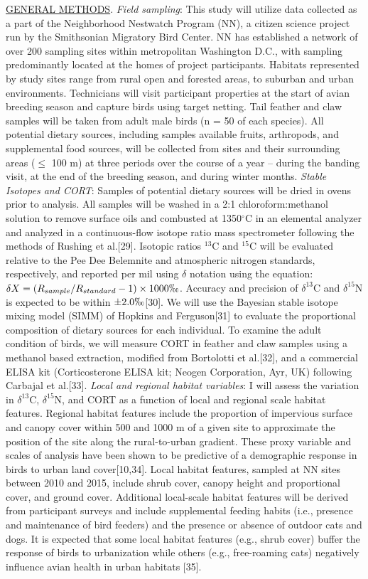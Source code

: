 \documentclass[12pt]{article}
\begin{document}
\noindent \underline{GENERAL METHODS}. \textit {Field sampling}: This study will utilize data collected as a part of the Neighborhood Nestwatch Program (NN), a citizen science project run by the Smithsonian Migratory Bird Center. NN has established a network of over 200 sampling sites within metropolitan Washington D.C., with sampling predominantly located at the homes of project participants. Habitats represented by study sites range from rural open and forested areas, to suburban and urban environments. Technicians will visit participant properties at the start of avian breeding season and capture birds using target netting. Tail feather and claw samples will be taken from adult male birds (n = 50 of each species). All potential dietary sources, including samples available fruits, arthropods, and supplemental food sources, will be collected from sites and their surrounding areas ($\leq$ 100 m) at three periods over the course of a year -- during the banding visit, at the end of the breeding season, and during winter months. \textit{Stable Isotopes and CORT}: Samples of potential dietary sources will be dried in ovens prior to analysis. All samples will be washed in a 2:1 chloroform:methanol solution to remove surface oils and combusted at 1350$^{\circ}$C in an elemental analyzer and analyzed in a continuous-flow isotope ratio mass spectrometer following the methods of Rushing et al.[29]. Isotopic ratios $^{13}$C and $^{15}$C will be evaluated relative to the Pee Dee Belemnite and atmospheric nitrogen standards, respectively, and reported per mil using $\delta$ notation using the equation: $\delta{X} = (R_{sample}/R_{standard} -1) \times 1000\permil$. Accuracy and precision of $\delta^{13}$C and $\delta^{15}$N is expected to be within $\pm 2.0 \permil$[30]. We will use the Bayesian stable isotope mixing model (SIMM) of Hopkins and Ferguson[31] to evaluate the proportional composition of dietary sources for each individual. To examine the adult condition of birds, we will measure CORT in feather and claw samples using a methanol based extraction, modified from Bortolotti et al.[32], and a commercial ELISA kit (Corticosterone ELISA kit; Neogen Corporation, Ayr, UK) following Carbajal et al.[33]. \textit{Local and regional habitat variables}: I will assess the variation in $\delta^{13}$C,  $\delta^{15}$N, and CORT as a function of local and regional scale habitat features. Regional habitat features include the proportion of impervious surface and canopy cover within 500 and 1000 m of a given site to approximate the position of the site along the rural-to-urban gradient. These proxy variable and scales of analysis have been shown to be predictive of a demographic response in birds to urban land cover[10,34]. Local habitat features, sampled at NN sites between 2010 and 2015, include shrub cover, canopy height and proportional cover, and ground cover. Additional local-scale habitat features will be derived from participant surveys and include supplemental feeding habits (i.e., presence and maintenance of bird feeders) and the presence or absence of outdoor cats and dogs. It is expected that some local habitat features (e.g., shrub cover) buffer the response of birds to urbanization while others (e.g., free-roaming cats) negatively influence avian health in urban habitats [35]. 
\end{document}
